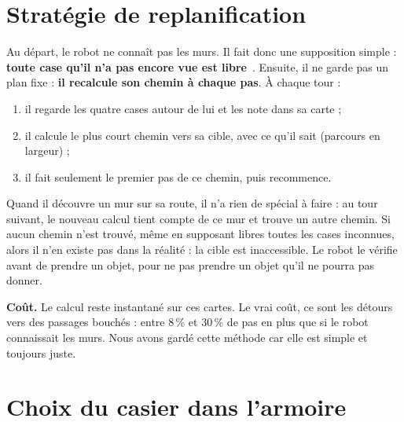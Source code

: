 \documentclass[11pt,a4paper]{article}
\begin{document}
\section{Stratégie de replanification}\label{sec:replan}

Au départ, le robot ne connaît pas les murs. Il fait donc une supposition simple : \textbf{toute case qu'il n'a pas encore vue est libre}~\cite{enonce}. Ensuite, il ne garde pas un plan fixe : \textbf{il recalcule son chemin à chaque pas}. À chaque tour :
\begin{enumerate}
  \item il regarde les quatre cases autour de lui et les note dans sa carte ;
  \item il calcule le plus court chemin vers sa cible, avec ce qu'il sait (parcours en largeur) ;
  \item il fait seulement le premier pas de ce chemin, puis recommence.
\end{enumerate}
Quand il découvre un mur sur sa route, il n'a rien de spécial à faire : au tour suivant, le nouveau calcul tient compte de ce mur et trouve un autre chemin. Si aucun chemin n'est trouvé, même en supposant libres toutes les cases inconnues, alors il n'en existe pas dans la réalité : la cible est inaccessible. Le robot le vérifie avant de prendre un objet, pour ne pas prendre un objet qu'il ne pourra pas donner.

\textbf{Coût.} Le calcul reste instantané sur ces cartes. Le vrai coût, ce sont les détours vers des passages bouchés : entre 8\,\% et 30\,\% de pas en plus que si le robot connaissait les murs. Nous avons gardé cette méthode car elle est simple et toujours juste.

\section{Choix du casier dans l'armoire}\label{sec:repli}
\end{document}
